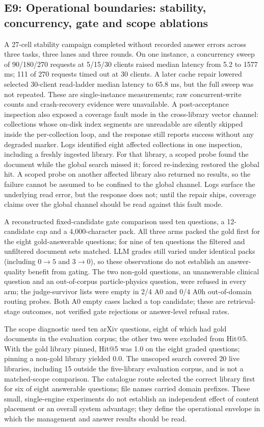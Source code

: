 \documentclass[11pt]{article}
\begin{document}
\subsection{E9: Operational boundaries: stability, concurrency, gate and
scope ablations}

A 27-cell stability campaign completed without recorded answer errors across
three tasks, three lanes and three rounds. On one instance, a concurrency
sweep of 90/180/270 requests at 5/15/30 clients raised median latency from
5.2 to 1577 ms; 111 of 270 requests timed out at 30 clients. A later cache
repair lowered selected 30-client read-ladder median latency to 65.8 ms,
but the full sweep was not repeated. These are single-instance measurements;
raw concurrent-write counts and crash-recovery evidence were unavailable. A
post-acceptance inspection also exposed a coverage fault mode in the
cross-library vector channel: collections whose on-disk index segments are
unreadable are silently skipped inside the per-collection loop, and the
response still reports success without any degraded marker. Logs identified
eight affected collections in one inspection, including a freshly ingested
library. For that library, a scoped probe found the document while the
global search missed it; forced re-indexing restored the global hit. A
scoped probe on another affected library also returned no results, so the
failure cannot be assumed to be confined to the global channel. Logs surface
the underlying read error, but the response does not; until the repair
ships, coverage claims over the global channel should be read against this
fault mode.

A reconstructed fixed-candidate gate comparison used ten questions, a
12-candidate cap and a 4,000-character pack. All three arms packed the gold
first for the eight gold-answerable questions; for nine of ten questions the
filtered and unfiltered document sets matched. LLM grades still varied under
identical packs (including $0\to5$ and $3\to0$), so these observations do
not establish an answer-quality benefit from gating. The two non-gold
questions, an unanswerable clinical question and an out-of-corpus
particle-physics question, were refused in every arm; the judge-survivor
lists were empty in 2/4 A0 and 0/4 A0h out-of-domain routing probes. Both
A0 empty cases lacked a top candidate; these are retrieval-stage outcomes,
not verified gate rejections or answer-level refusal rates.

The scope diagnostic used ten arXiv questions, eight of which had gold
documents in the evaluation corpus; the other two were excluded from Hit@5.
With the gold library pinned, Hit@5 was 1.0 on the eight graded questions;
pinning a non-gold library yielded 0.0. The unscoped search covered 20 live
libraries, including 15 outside the five-library evaluation corpus, and is
not a matched-scope comparison. The catalogue route selected the correct
library first for six of eight answerable questions; file names carried
domain prefixes. These small, single-engine experiments do not establish an
independent effect of content placement or an overall system advantage;
they define the operational envelope in which the management and answer
results should be read.
\end{document}
